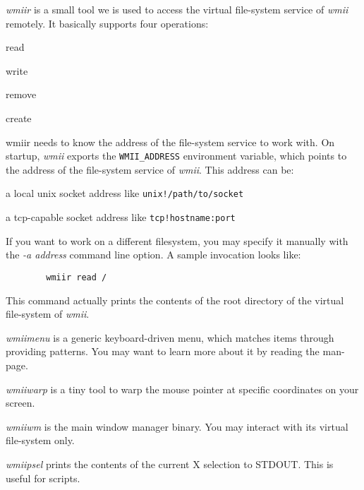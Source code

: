 \documentclass[12pt,a4paper]{article} %
\newcommand{\wmii}{\emph{wmii}}
\newenvironment{itemize*}
  {\begin{itemize}
      \setlength{\itemsep}{0pt}
      \setlength{\parskip}{0pt}}
  {\end{itemize}}
\begin{document}
    \begin{description}
      
    \item
      \emph{wmiir} is a small tool we is used to access the
      virtual file-system service of \wmii{} remotely. It basically supports four
      operations:

      \begin{itemize*}
      \item read
      \item write
      \item remove
      \item create
      \end{itemize*}

      wmiir needs to know the address of the file-system service to work
      with. On startup, \wmii{} exports the \verb+WMII_ADDRESS+ environment variable,
      which points to the address of the file-system service of \wmii.
      This address can be:
      \begin{itemize*}
      \item a local unix socket address like \verb+unix!/path/to/socket+ 
      \item a tcp-capable socket address like \verb+tcp!hostname:port+ 
      \end{itemize*}
      
      If you want to work on a different filesystem, you may specify it
      manually with the \emph{-a  address} command line option.
      A sample invocation looks like:
      \begin{verbatim}
        wmiir read /
      \end{verbatim}
      This command actually prints the contents of the root directory of the
      virtual file-system of \wmii.

    \item
      \emph{wmiimenu} is a generic keyboard-driven menu, which matches items
      through providing patterns.  You may want to learn more about it by reading
      the man-page.

    \item
      \emph{wmiiwarp} is a tiny tool to warp the mouse pointer at specific
      coordinates on your screen.

    \item
      \emph{wmiiwm} is the main window manager binary. You may interact
      with its virtual file-system only.

    \item
      \emph{wmiipsel} prints the contents of the current X selection to
      STDOUT. This is useful for scripts.

    \end{description}
\end{document}

